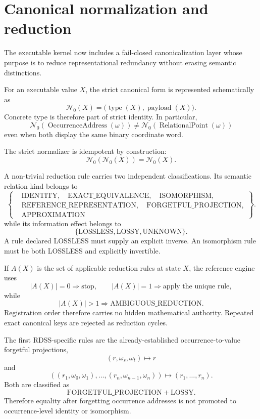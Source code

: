 \documentclass[11pt]{article}
\begin{document}
\section{Canonical normalization and reduction}

The executable kernel now includes a fail-closed canonicalization layer whose
purpose is to reduce representational redundancy without erasing semantic
distinctions.

For an executable value \(X\), the strict canonical form is represented
schematically as
\[
\mathcal N_0(X)
=
\bigl(\operatorname{type}(X),\operatorname{payload}(X)\bigr).
\]
Concrete type is therefore part of strict identity. In particular,
\[
\boxed{
\mathcal N_0\!\left(\operatorname{OccurrenceAddress}(\omega)\right)
\neq
\mathcal N_0\!\left(\operatorname{RelationalPoint}(\omega)\right)
}
\]
even when both display the same binary coordinate word.

The strict normalizer is idempotent by construction:
\[
\boxed{
\mathcal N_0(\mathcal N_0(X))=\mathcal N_0(X).
}
\]

A non-trivial reduction rule carries two independent classifications. Its
semantic relation kind belongs to
\[
\left\{
\begin{aligned}
&\mathrm{IDENTITY},\quad \mathrm{EXACT\_EQUIVALENCE},\quad \mathrm{ISOMORPHISM},\\
&\mathrm{REFERENCE\_REPRESENTATION},\quad \mathrm{FORGETFUL\_PROJECTION},\\
&\mathrm{APPROXIMATION}
\end{aligned}
\right\}.
\]
while its information effect belongs to
\[
\{
\mathrm{LOSSLESS},
\mathrm{LOSSY},
\mathrm{UNKNOWN}
\}.
\]
A rule declared LOSSLESS must supply an explicit inverse. An isomorphism rule
must be both LOSSLESS and explicitly invertible.

If \(A(X)\) is the set of applicable reduction rules at state \(X\), the
reference engine uses
\[
|A(X)|=0
\Rightarrow
\text{stop},
\qquad
|A(X)|=1
\Rightarrow
\text{apply the unique rule},
\]
while
\[
\boxed{
|A(X)|>1
\Rightarrow
\mathrm{AMBIGUOUS\_REDUCTION}.
}
\]
Registration order therefore carries no hidden mathematical authority.
Repeated exact canonical keys are rejected as reduction cycles.

The first RDSS-specific rules are the already-established occurrence-to-value
forgetful projections,
\[
(r,\omega_s,\omega_t)\longmapsto r
\]
and
\[
((r_1,\omega_0,\omega_1),\ldots,(r_n,\omega_{n-1},\omega_n))
\longmapsto
(r_1,\ldots,r_n).
\]
Both are classified as
\[
\boxed{
\mathrm{FORGETFUL\_PROJECTION}
+
\mathrm{LOSSY}.
}
\]
Therefore equality after forgetting occurrence addresses is not promoted to
occurrence-level identity or isomorphism.
\end{document}
